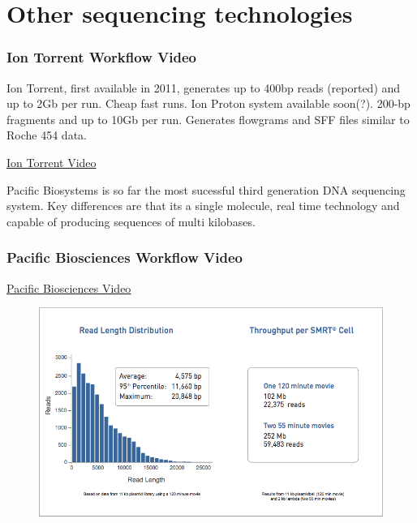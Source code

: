 \documentclass[pdf]{beamer}
\begin{document}
\section{Other sequencing technologies}
\begin{frame}
  \frametitle{Ion Torrent Workflow Video}
Ion Torrent, first available in 2011, generates up to 400bp reads (reported) and up to 2Gb per run. Cheap fast runs. Ion Proton system available soon(?). 200-bp fragments and up to 10Gb per run. Generates flowgrams and SFF files similar to Roche 454 data.
  \begin{center}
  \href{http://www.youtube.com/watch?v=jbVbddI2Hpg}{Ion Torrent Video}
  \end{center}
\end{frame} 


\begin{frame}
Pacific Biosystems is so far the most sucessful third generation DNA sequencing system. Key differences are that its a single molecule, real time technology and capable of producing sequences of multi kilobases.
  \frametitle{Pacific Biosciences Workflow Video}
  \begin{center}
  \href{http://www.youtube.com/watch?v=NHCJ8PtYCFc&feature=endscreen&NR=1}{Pacific Biosciences Video}
  \end{center}
  \begin{center}
    \begin{figure}
    \includegraphics[scale=0.30]{PacBio-specs.png}
  \end{figure}
  \end{center}

\end{frame} 
\end{document}
